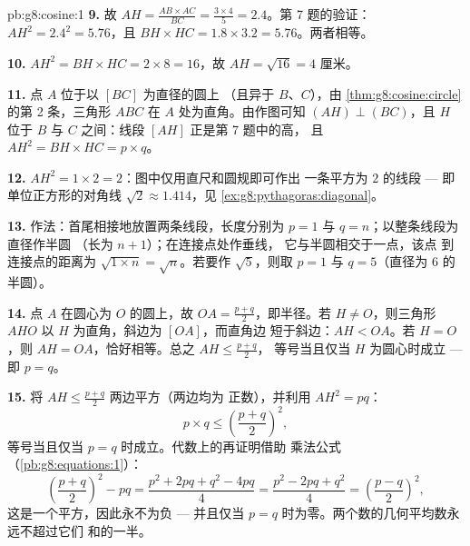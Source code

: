 \begin{solution}{pb:g8:cosine:1}
\textbf{9.} 故 $AH = \frac{AB \times AC}{BC} = \frac{3 \times 4}{5}
= 2.4$。第 7 题的验证：
$AH^2 = 2.4^2 = 5.76$，且
$BH \times HC = 1.8 \times 3.2 = 5.76$。两者相等。

\textbf{10.} $AH^2 = BH \times HC = 2 \times 8 = 16$，故
$AH = \sqrt{16} = 4$ 厘米。

\textbf{11.} 点 $A$ 位于以 $[BC]$ 为直径的圆上
（且异于 $B$、$C$），由
\cref{thm:g8:cosine:circle} 的第 2 条，三角形 $ABC$ 在
$A$ 处为直角。由作图可知 $(AH) \perp (BC)$，且 $H$ 位于 $B$ 与
$C$ 之间：线段 $[AH]$ 正是第 7 题中的高，
且 $AH^2 = BH \times HC = p \times q$。

\textbf{12.} $AH^2 = 1 \times 2 = 2$：图中仅用直尺和圆规即可作出
一条平方为 $2$ 的线段 --- 即
单位正方形的对角线 $\sqrt2 \approx 1.414$，见
\cref{ex:g8:pythagoras:diagonal}。

\textbf{13.} 作法：首尾相接地放置两条线段，长度分别为
$p = 1$ 与 $q = n$；以整条线段为直径作半圆
（长为 $n + 1$）；在连接点处作垂线，
它与半圆相交于一点，该点
到连接点的距离为 $\sqrt{1 \times n} = \sqrt n$。若要作
$\sqrt5$，则取 $p = 1$ 与 $q = 5$（直径为
$6$ 的半圆）。

\textbf{14.} 点 $A$ 在圆心为 $O$ 的圆上，故
$OA = \frac{p+q}{2}$，即半径。若 $H \neq O$，则三角形
$AHO$ 以 $H$ 为直角，斜边为 $[OA]$，而直角边
短于斜边：$AH < OA$。若 $H = O$，则
$AH = OA$，恰好相等。总之 $AH \leq \frac{p+q}{2}$，
等号当且仅当 $H$ 为圆心时成立 --- 即
$p = q$。

\textbf{15.} 将 $AH \leq \frac{p+q}{2}$ 两边平方（两边均为
正数），并利用 $AH^2 = pq$：
\[
p \times q \leq \left(\frac{p+q}{2}\right)^2 ,
\]
等号当且仅当 $p = q$ 时成立。代数上的再证明借助
乘法公式（\cref{pb:g8:equations:1}）：
\[
\left(\frac{p+q}{2}\right)^2 - pq
= \frac{p^2 + 2pq + q^2 - 4pq}{4}
= \frac{p^2 - 2pq + q^2}{4}
= \left(\frac{p-q}{2}\right)^2 ,
\]
这是一个平方，因此永不为负 --- 并且仅当
$p = q$ 时为零。两个数的几何平均数永远不超过它们
和的一半。
\end{solution}
